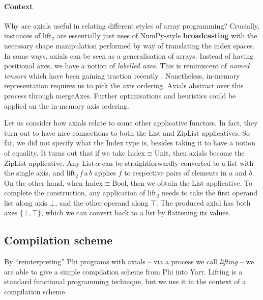 \paragraph{Context} Why are axials useful in relating different styles of array programming? Crucially, instances of $\mathrm{lift}_2$ are essentially just uses of NumPy-style \textbf{broadcasting} with the necessary shape manipulation performed by way of translating the index spaces. In some ways, axials can be seen as a generalisation of arrays. Instead of having positional axes, we have a notion of \textit{labelled axes}. This is reminiscent of \textit{named tensors} which have been gaining traction recently \cite{chiang2022named}. Nonetheless, in-memory representation requires us to pick the axis ordering. Axials abstract over this process through $\mathrm{mergeAxes}$. Further optimisations and heuristics could be applied on the in-memory axis ordering.

Let us consider how axials relate to some other applicative functors. In fact, they turn out to have nice connections to both the $\mathrm{List}$ and $\mathrm{ZipList}$ applicatives. So far, we did not specify what the $\mathrm{Index}$ type is, besides taking it to have a notion of equality. It turns out that if we take $\mathrm{Index} \equiv \mathrm{Unit}$, then axials become the $\mathrm{ZipList}$ applicative. Any $\mathrm{List}\,\alpha$ can be straightforwardly converted to a list with the single axis, and $\mathrm{lift}_2\,f\,a\,b$ applies $f$ to respective pairs of elements in $a$ and $b$.
On the other hand, when $\mathrm{Index} \equiv \mathrm{Bool}$, then we obtain the $\mathrm{List}$ applicative. To complete the construction, any application of $\mathrm{lift}_2$ needs to take the first operand list along axis $\bot$, and the other operand along $\top$. The produced axial has both axes $\{ \bot, \top \}$, which we can convert back to a list by flattening its values.


\subsection{Compilation scheme}

By ``reinterpreting'' Phi programs with axials -- via a process we call \textit{lifting} -- we are able to give a simple compilation scheme from Phi into Yarr. Lifting is a standard functional programming technique, but we use it in the context of a compilation scheme. 

\todothis



